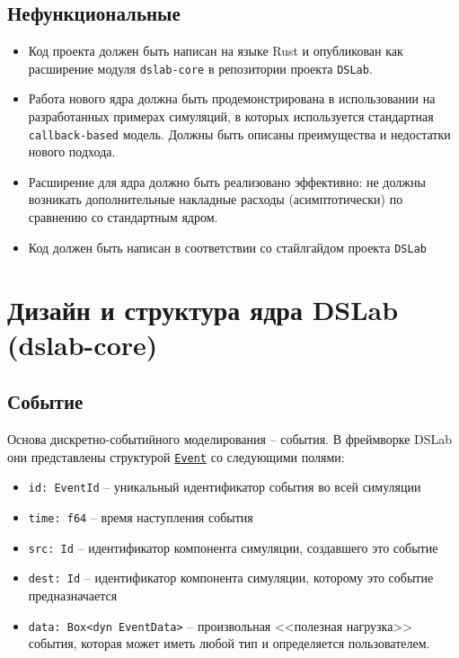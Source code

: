 \subsection{Нефункциональные}
\begin{itemize}
    \item Код проекта должен быть написан на языке Rust и опубликован как расширение модуля \texttt{dslab-core} в репозитории проекта \texttt{DSLab}\cite{dslab-repo}.
    \item Работа нового ядра должна быть продемонстрирована в использовании на разработанных примерах симуляций, в которых используется стандартная \texttt{callback-based} модель. Должны быть описаны преимущества и недостатки нового подхода.
    \item Расширение для ядра должно быть реализовано эффективно: не должны возникать дополнительные накладные расходы (асимптотически) по сравнению со стандартным ядром.
    \item Код должен быть написан в соответствии со стайлгайдом проекта \texttt{DSLab}
\end{itemize}




\section{Дизайн и структура ядра DSLab (dslab-core)} \label{dslab-core-design}

\subsection{Событие} \label{Event}
Основа дискретно-событийного моделирования -- события. В фреймворке DSLab они представлены структурой \underline{\texttt{Event}} со следующими полями: 
\begin{itemize}
    \item \texttt{id: EventId} -- уникальный идентификатор события во всей симуляции
    \item \texttt{time: f64} -- время наступления события 
    \item \texttt{src: Id} -- идентификатор компонента симуляции, создавшего это событие 
    \item \texttt{dest: Id} -- идентификатор компонента симуляции, которому это событие предназначается
    \item \label{Event:payload} \texttt{data: Box<dyn EventData>} -- произвольная <<полезная нагрузка>> события, которая может иметь любой тип и определяется пользователем. 
\end{itemize}

